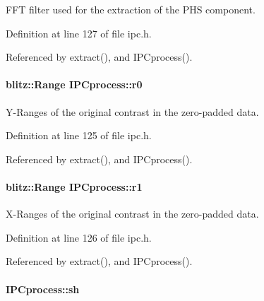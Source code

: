 FFT filter used for the extraction of the PHS component. 



Definition at line 127 of file ipc.h.



Referenced by extract(), and IPCprocess().

\hypertarget{classIPCprocess_a76e82f07d77804b10708a20597157eb8}{
\paragraph[{r0}]{\setlength{\rightskip}{0pt plus 5cm}blitz::Range {\bf IPCprocess::r0}}\hfill}
\label{classIPCprocess_a76e82f07d77804b10708a20597157eb8}


Y-\/Ranges of the original contrast in the zero-\/padded data. 



Definition at line 125 of file ipc.h.



Referenced by extract(), and IPCprocess().

\hypertarget{classIPCprocess_ac8a99daf63b477302d9eb16a93034b42}{
\paragraph[{r1}]{\setlength{\rightskip}{0pt plus 5cm}blitz::Range {\bf IPCprocess::r1}}\hfill}
\label{classIPCprocess_ac8a99daf63b477302d9eb16a93034b42}


X-\/Ranges of the original contrast in the zero-\/padded data. 



Definition at line 126 of file ipc.h.



Referenced by extract(), and IPCprocess().

\hypertarget{classIPCprocess_a3f789a5d26ee977c7763659d8a4e2e16}{
\paragraph[{sh}]{ {\bf IPCprocess::sh}}\hfill}
\label{classIPCprocess_a3f789a5d26ee977c7763659d8a4e2e16}


